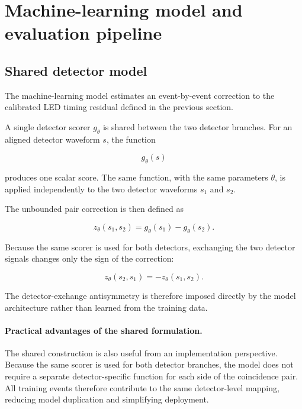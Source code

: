 \section{Machine-learning model and evaluation pipeline}

\subsection{Shared detector model}

The machine-learning model estimates an event-by-event correction to the calibrated LED timing residual defined in the previous section.

A single detector scorer \(g_\theta\) is shared between the two detector branches. 
For an aligned detector waveform \(s\), the function

\begin{equation}
    g_\theta(s)
\end{equation}

produces one scalar score. The same function, with the same parameters \(\theta\), is applied independently to the two detector waveforms 
\(s_1\) and \(s_2\).

The unbounded pair correction is then defined as

\begin{equation}
    z_\theta(s_1,s_2)
    =
    g_\theta(s_1)-g_\theta(s_2).
\end{equation}

Because the same scorer is used for both detectors, exchanging the two detector signals changes only the sign of the correction:

\begin{equation}
    z_\theta(s_2,s_1)
    =
    -z_\theta(s_1,s_2).
\end{equation}

The detector-exchange antisymmetry is therefore imposed directly by the model architecture rather than learned from the training data.

\paragraph{Practical advantages of the shared formulation.}
The shared construction is also useful from an implementation perspective. Because the same scorer is used for both detector branches, the model does not require a separate detector-specific function for each side of the coincidence pair. All training events therefore contribute to the same detector-level mapping, reducing model duplication and simplifying deployment.

